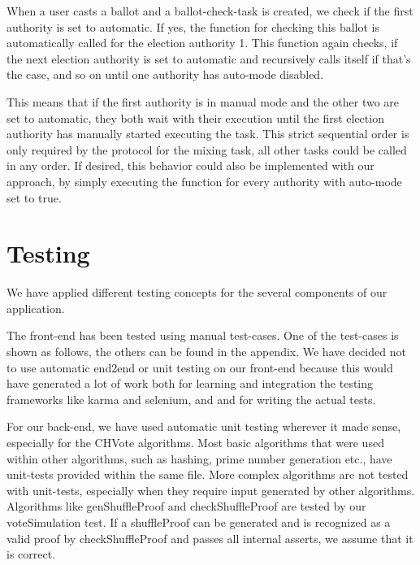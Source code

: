 When a user casts a ballot and a ballot-check-task is created, we check if the first authority is set to automatic. If yes, the function for checking this ballot is automatically called for the election authority 1. This function again checks, if the next election authority is set to automatic and recursively calls itself if that's the case, and so on until one authority has auto-mode disabled.

This means that if the first authority is in manual mode and the other two are set to automatic, they both wait with their execution until the first election authority has manually started executing the task. This strict sequential order is only required by the protocol for the mixing task, all other tasks could be called in any order. If desired, this behavior could also be implemented with our approach, by simply executing the function for every authority with auto-mode set to true.

\section{Testing}
We have applied different testing concepts for the several components of our application.

The front-end has been tested using manual test-cases. One of the test-cases is shown as follows, the others can be found in the appendix. We have decided not to use automatic end2end or unit testing on our front-end because this would have generated a lot of work both for learning and integration the testing frameworks like karma and selenium, and and for writing the actual tests. 

For our back-end, we have used automatic unit testing wherever it made sense, especially for the CHVote algorithms. Most basic algorithms that were used within other algorithms, such as hashing, prime number generation etc., have unit-tests provided within the same file. More complex algorithms are not tested with unit-tests, especially when they require input generated by other algorithms. Algorithms like genShuffleProof and checkShuffleProof are tested by our voteSimulation test. If a shuffleProof can be generated and is recognized as a valid proof by checkShuffleProof and passes all internal asserts, we assume that it is correct.